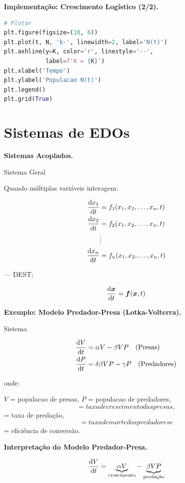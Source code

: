 \textbf{Implementação: Crescimento Logístico (2/2).}

%
\begin{lstlisting}[language=Python, caption=Visualização]
# Plotar
plt.figure(figsize=(10, 6))
plt.plot(t, N, 'b-', linewidth=2, label='N(t)')
plt.axhline(y=K, color='r', linestyle='--',
            label=f'K = {K}')
plt.xlabel('Tempo')
plt.ylabel('Populacao N(t)')
plt.legend()
plt.grid(True)
\end{lstlisting}
%

\section{Sistemas de EDOs}

\textbf{Sistemas Acoplados.}

Sistema Geral

Quando múltiplas variáveis interagem:

%
\begin{align*}
\frac{\mathrm{d} x_1}{\mathrm{d} t} &= f_1(x_1, x_2, \ldots, x_n, t)\\
\frac{\mathrm{d} x_2}{\mathrm{d} t} &= f_2(x_1, x_2, \ldots, x_n, t)\\
&\vdots\\
\frac{\mathrm{d} x_n}{\mathrm{d} t} &= f_n(x_1, x_2, \ldots, x_n, t)
\end{align*}
%

--- DEST: 

%
\begin{equation*}
\frac{\mathrm{d} \boldsymbol{x}}{\mathrm{d} t} = \boldsymbol{f}(\boldsymbol{x}, t)
\end{equation*}
%

\textbf{Exemplo: Modelo Predador-Presa (Lotka-Volterra).}

Sistema

%
\begin{align*}
\frac{\mathrm{d} V}{\mathrm{d} t} &= \alpha V - \beta V P \quad \text{(Presas)}\\
\frac{\mathrm{d} P}{\mathrm{d} t} &= \delta \beta V P - \gamma P \quad \text{(Predadores)}
\end{align*}
%

onde:

$V$ = populacao de presas, $P$ = populacao de predadores, $$ = taxa de crescimento das presas, $$ = taxa de predação, $$ = taxa de morte dos predadores e $$ = eficiência de conversão.

\textbf{Interpretação do Modelo Predador-Presa.}

%
\begin{equation*}
\frac{\mathrm{d} V}{\mathrm{d} t} = \underbrace{\alpha V}_{\text{crescimento}} - \underbrace{\beta V P}_{\text{predação}}
\end{equation*}
%

